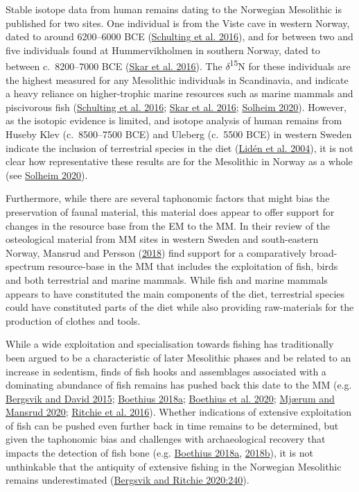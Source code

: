 \documentclass[
  12pt,
  a4paper,
  oneside]{book}
\begin{document}
Stable isotope data from human remains dating to the Norwegian Mesolithic is published for two sites. One individual is from the Viste cave in western Norway, dated to around 6200--6000 BCE (\protect\hyperlink{ref-schulting2016}{Schulting et al. 2016}), and for between two and five individuals found at Hummervikholmen in southern Norway, dated to between c.~8200--7000 BCE (\protect\hyperlink{ref-skar2016}{Skar et al. 2016}). The \(\delta\)\textsuperscript{15}N for these individuals are the highest measured for any Mesolithic individuals in Scandinavia, and indicate a heavy reliance on higher-trophic marine resources such as marine mammals and piscivorous fish (\protect\hyperlink{ref-schulting2016}{Schulting et al. 2016}; \protect\hyperlink{ref-skar2016}{Skar et al. 2016}; \protect\hyperlink{ref-solheim2020}{Solheim 2020}). However, as the isotopic evidence is limited, and isotope analysis of human remains from Huseby Klev (c.~8500--7500 BCE) and Uleberg (c.~5500 BCE) in western Sweden indicate the inclusion of terrestrial species in the diet (\protect\hyperlink{ref-liden2004}{Lidén et al. 2004}), it is not clear how representative these results are for the Mesolithic in Norway as a whole (see \protect\hyperlink{ref-solheim2020}{Solheim 2020}).

Furthermore, while there are several taphonomic factors that might bias the preservation of faunal material, this material does appear to offer support for changes in the resource base from the EM to the MM. In their review of the osteological material from MM sites in western Sweden and south-eastern Norway, Mansrud and Persson (\protect\hyperlink{ref-mansrud2018}{2018}) find support for a comparatively broad-spectrum resource-base in the MM that includes the exploitation of fish, birds and both terrestrial and marine mammals. While fish and marine mammals appears to have constituted the main components of the diet, terrestrial species could have constituted parts of the diet while also providing raw-materials for the production of clothes and tools.

While a wide exploitation and specialisation towards fishing has traditionally been argued to be a characteristic of later Mesolithic phases and be related to an increase in sedentism, finds of fish hooks and assemblages associated with a dominating abundance of fish remains has pushed back this date to the MM (e.g. \protect\hyperlink{ref-bergsvik2015}{Bergsvik and David 2015}; \protect\hyperlink{ref-boethius2018}{Boethius 2018a}; \protect\hyperlink{ref-boethius2020}{Boethius et al. 2020}; \protect\hyperlink{ref-mjuxe6rum2020}{Mjærum and Mansrud 2020}; \protect\hyperlink{ref-ritchie2016}{Ritchie et al. 2016}). Whether indications of extensive exploitation of fish can be pushed even further back in time remains to be determined, but given the taphonomic bias and challenges with archaeological recovery that impacts the detection of fish bone (e.g. \protect\hyperlink{ref-boethius2018}{Boethius 2018a}, \protect\hyperlink{ref-boethius2018b}{2018b}), it is not unthinkable that the antiquity of extensive fishing in the Norwegian Mesolithic remains underestimated (\protect\hyperlink{ref-bergsvik2020b}{Bergsvik and Ritchie 2020:240}).
\end{document}
